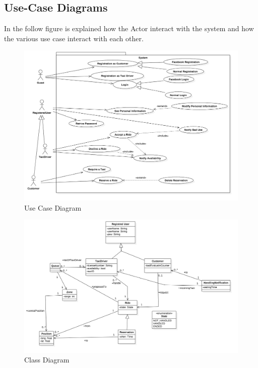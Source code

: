 \subsection{Use-Case Diagrams}
	In the follow figure is explained how the Actor interact with the system and how the various use case interact with each other.


				\begin{figure}[H]
					\centering
					\includegraphics[width=\textwidth, scale=0.5]{IMG/UseCaseDiagram.png}
					\caption{Use Case Diagram}\label{sec:UseCaseDiagramFigure}
				\end{figure}
				
				\begin{figure}[H]
					\centering
					\includegraphics[width=\textwidth, scale=0.5]{IMG/ClassDiagram.png}
					\caption{Class Diagram}\label{sec:ClassDiagramFigure}
				\end{figure}

				
